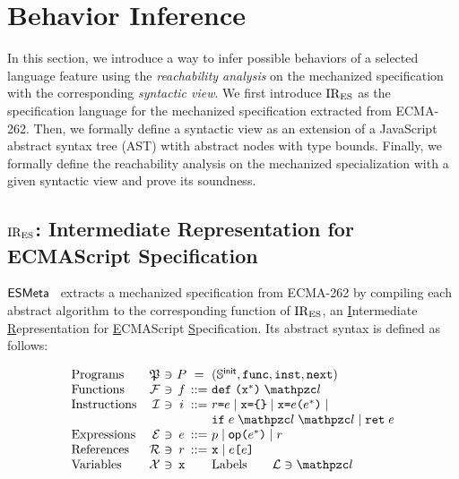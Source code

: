 \section{Behavior Inference}\label{sec:infer}

In this section, we introduce a way to infer possible behaviors of a selected
language feature using the \textit{reachability analysis} on the mechanized
specification with the corresponding \textit{syntactic view}.  We first
introduce $\text{IR}_\text{ES}$ as the specification language for the mechanized specification
extracted from ECMA-262.  Then, we formally define a syntactic view as an
extension of a JavaScript abstract syntax tree (AST) wtith abstract nodes with
type bounds.  Finally, we formally define the reachability analysis on the
mechanized specialization with a given syntactic view and prove its soundness.

\subsection{$\text{IR}_\text{ES}$: Intermediate Representation for ECMAScript Specification}

$\esmeta$~\cite{jiset, esmeta} extracts a mechanized specification from ECMA-262
by compiling each abstract algorithm to the corresponding function of $\text{IR}_\text{ES}$,
an \underline{I}ntermediate \underline{R}epresentation for
\underline{E}CMAScript \underline{S}pecification.  Its abstract syntax is
defined as follows:

\[
  \begin{array}{lr@{~}c@{~}c@{~}c@{~}l}
    \text{Programs} & \progset &\ni& \prog &=& (\initstset,
    \getfunc, \getinst, \getnext)\\

    \text{Functions} & \funcset &\ni& \func &::=&
    \kwdef \; \kwrl \varx^* \kwrr \; \lab\\

    \text{Instructions} & \instset &\ni& \inst &::=&
    \refer \kweq \expr \mid
    \varx \kweq \kwcl \kwcr \mid
    \varx \kweq \expr \kwrl \expr^* \kwrr \mid \\&&&&&
    \kwif \; \expr \; \lab \; \lab \mid
    \kwret \; \expr\\

    \text{Expressions} & \exprset &\ni& \expr &::=&
    \pval \mid
    \op \kwrl \expr^* \kwrr \mid
    \refer\\

    \text{References} & \referset &\ni& \refer &::=&
    \varx \mid \expr \kwsl \expr \kwsr\\

    \text{Variables} & \varset &\ni& \varx &&

    \text{Labels} \qquad \labset \ni \lab\\
  \end{array}
\]

